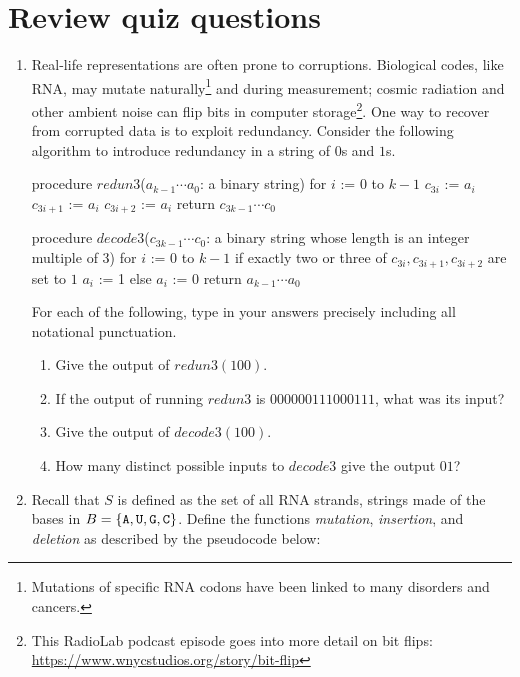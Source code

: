 \documentclass[12pt, oneside]{article}
\begin{document}
\section*{Review quiz questions}
\begin{enumerate}
\item
Real-life representations are often prone to corruptions.  Biological codes, like RNA, 
may mutate naturally\footnote{Mutations of specific RNA codons have been linked to many disorders and cancers.}
and during measurement; cosmic radiation and other ambient noise 
can flip bits in computer storage\footnote{This RadioLab podcast episode
goes into more detail on bit flips: \url{https://www.wnycstudios.org/story/bit-flip}}. 
One way to recover from corrupted data is to exploit redundancy.  
Consider the following algorithm to introduce redundancy in a string of $0$s and $1$s.
\begin{algorithm}[caption={Create redundancy by repeating each bit three times}]
procedure $\textit{redun3}$($a_{k-1} \cdots a_0$: a binary string)
for $i$ := $0$ to $k-1$
  $c_{3i}$ := $a_i$
  $c_{3i+1}$ := $a_i$
  $c_{3i+2}$ := $a_i$
return $c_{3k-1} \cdots c_0$
\end{algorithm}

\begin{algorithm}[caption={Decode sequence of bits using majority rule on consecutive three bit sequences}]
procedure $\textit{decode3}$($c_{3k-1} \cdots c_0$: a binary string whose length is an integer multiple of $3$)
for $i$ := $0$ to $k-1$
  if exactly two or three of $c_{3i}, c_{3i+1}, c_{3i+2}$ are set to $1$
    $a_i$ := 1
  else 
    $a_i$ := 0
return $a_{k-1} \cdots a_0$
\end{algorithm}

For each of the following, type in your answers precisely including all notational punctuation.

\begin{enumerate}
\item  Give the output of $redun3(100)$.
\item  If the output of running $redun3$ is $000000111000111$, what was its input?
\item  Give the output of $decode3(100)$.
\item  How many distinct possible inputs to $decode3$ give the output $01$?
\end{enumerate}

\newpage
\item Recall that $S$ is defined as the set of all RNA strands, strings made of the bases in 
 $B = \{\texttt{A},\texttt{U},\texttt{G},\texttt{C}\}$. Define the functions \textit{mutation}, \textit{insertion}, and \textit{deletion} as described by the pseudocode below:


\end{enumerate}
\end{document}

